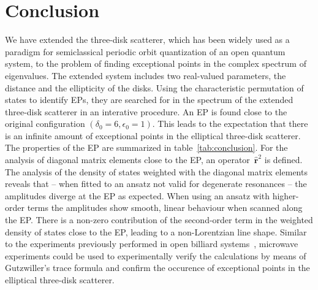 \documentclass[doublecol]{epl2}
\renewcommand{\vec}[1]{\boldsymbol{#1}}
\begin{document}
\section{Conclusion}
We have extended the three-disk scatterer, which has been widely used as a paradigm for semiclassical periodic orbit quantization of an open quantum system, to the problem of finding exceptional points in the complex spectrum of eigenvalues. The extended system includes two real-valued parameters, the distance and the ellipticity of the disks. Using the characteristic permutation of states to identify EPs, they are searched for in the spectrum of the extended three-disk scatterer in an interative procedure. An EP is found close to the original configuration $(\delta_0 = 6, \epsilon_0 = 1)$. This leads to the expectation that there is an infinite amount of exceptional points in the elliptical three-disk scatterer. The properties of the EP are summarized in table~\ref{tab:conclusion}. For the analysis of diagonal matrix elements close to the EP, an operator~$\hat{\vec{r}}^2$ is defined. The analysis of the density of states weighted with the diagonal matrix elements reveals that -- when fitted to an ansatz not valid for degenerate resonances -- the amplitudes diverge at the EP as expected. When using an ansatz with higher-order terms the amplitudes show smooth, linear behaviour when scanned along the EP. There is a non-zero contribution of the second-order term in the weighted density of states close to the EP, leading to a non-Lorentzian line shape. Similar to the experiments previously performed in open billiard systems~\cite{dembowski_experimental_2001,dietz_exceptional_2011,bittner_scattering_2014}, microwave experiments could be used to experimentally verify the calculations by means of Gutzwiller's trace formula and confirm the occurence of exceptional points in the elliptical three-disk scatterer.

\end{document}
